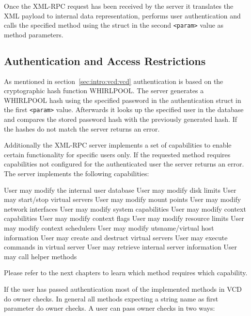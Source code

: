 Once the XML-RPC request has been received by the server it translates the XML
payload to internal data representation, performs user authentication and calls
the specified method using the struct in the second \verb,<param>, value as method
parameters.


\subsection{Authentication and Access Restrictions}

As mentioned in section~\ref{sec:intro:vcd:vcd} authentication is based on the
cryptographic hash function WHIRLPOOL. The server generates a WHIRLPOOL hash
using the specified password in the authentication struct in the first
\verb,<param>, value. Afterwards it looks up the specified user in the database
and compares the stored password hash with the previously generated hash. If
the hashes do not match the server returns an error.

Additionally the XML-RPC server implements a set of capabilities to enable
certain functionality for specific users only. If the requested method requires
capabilities not configured for the authenticated user the server returns an
error. The server implements the following capabilities:

\begin{labeling}{}
   User may modify the internal user database
   User may modify disk limits
   User may start/stop virtual servers
  User may modify mount points
    User may modify network interfaces
   User may modify system capabilities
   User may modify context capabilities
  User may modify context flags
   User may modify resource limits
  User may modify context schedulers
  User may modify utsname/virtual host information
 User may create and destruct virtual servers
   User may execute commands in virtual server
   User may retrieve internal server information
 User may call helper methods
\end{labeling}

Please refer to the next chapters to learn which method requires which
capability.

If the user has passed authentication most of the implemented methods in VCD do
owner checks. In general all methods expecting a string name as first parameter
do owner checks. A user can pass owner checks in two ways:

